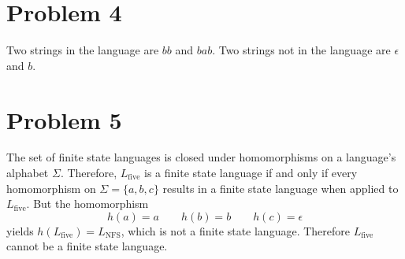 \documentclass[12pt]{article}
\begin{document}
\section*{Problem 4}

Two strings in the language are \(bb\) and \(bab\). Two strings not in the language are \(\epsilon\) and \(b\).

\section*{Problem 5}

The set of finite state languages is closed under homomorphisms on a language's alphabet \(\Sigma\). Therefore, \(L_\text{five}\) is a
finite state language if and only if every homomorphism on \(\Sigma=\{a, b, c\}\) results in a finite state language when applied
to \(L_\text{five}\). But the homomorphism
\[h(a)=a \qquad h(b)=b \qquad h(c)=\epsilon\]
yields \(h(L_\text{five})=L_\text{NFS}\), which is not a finite state language. Therefore \(L_\text{five}\) cannot be a finite
state language.
\end{document}
